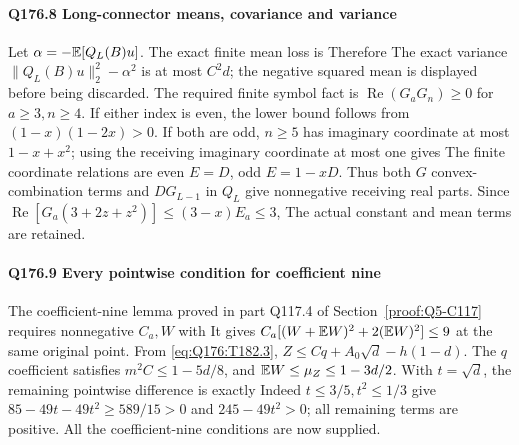 \paragraph{Q176.8 Long-connector means, covariance and variance}\label{part:Q176.8}
Let $\alpha=\allowbreak -\mathbb E[Q_L(B)u]$. The exact finite mean loss is
Therefore
The exact variance $\|Q_L(B)u\|_2^2-\alpha^2$ is at most $C^2d$;
the negative squared mean is displayed before being discarded.
The required finite symbol fact is
$\operatorname{Re}(G_aG_n)\ge\allowbreak 0$ for $a\ge\allowbreak 3,\allowbreak n\ge\allowbreak 4$.
If either index is even, the lower bound follows from $(1-x)(1-2x)>\allowbreak 0$.
If both are odd, $n\ge\allowbreak 5$ has imaginary coordinate at most $1-x+x^2$;
using the receiving imaginary coordinate at most one gives
The finite coordinate relations are even $E=\allowbreak D$, odd $E=\allowbreak 1-xD$.
Thus both $G$ convex-combination terms and $DG_{L-1}$ in $Q_L$ give
nonnegative receiving real parts.
Since $\operatorname{Re}[G_a(3+2z+z^2)]\le\allowbreak (3-x)E_a\le\allowbreak 3$,
The actual constant and mean terms are retained.

\paragraph{Q176.9 Every pointwise condition for coefficient nine}\label{part:Q176.9}
The coefficient-nine lemma proved in part Q117.4 of
Section~\ref{proof:Q5-C117} requires nonnegative $C_a,\allowbreak W$ with
It gives $C_a[(W+\mathbb E W)^2+2(\mathbb E W)^2]\le\allowbreak 9$ at the same original point.
From \eqref{eq:Q176:T182.3},
$Z\le\allowbreak  Cq+A_0\sqrt d-h(1-d)$.
The $q$ coefficient satisfies $m^2C\le\allowbreak 1-5d/8$, and
$\mathbb E W\le\allowbreak \mu_Z\le\allowbreak 1-3d/2$.
With $t=\allowbreak \sqrt d$, the remaining pointwise difference is exactly
Indeed $t\le\allowbreak 3/5,\allowbreak t^2\le\allowbreak 1/3$ give
$85-49t-49t^2\ge\allowbreak 589/15>\allowbreak 0$ and $245-49t^2>\allowbreak 0$; all remaining terms
are positive. All the coefficient-nine conditions are now supplied.


